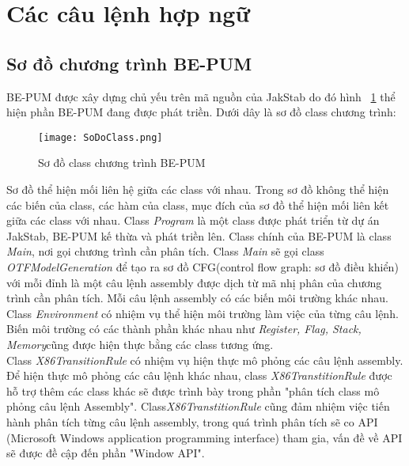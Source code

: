 \section{Các câu lệnh hợp ngữ}
	\subsection{Sơ đồ chương trình BE-PUM}
		BE-PUM được xây dựng chủ yếu trên mã nguồn của JakStab do đó hình ~\ref{fig:SoDoClass} thể hiện phần BE-PUM đang được phát triền. Dưới dây là sơ đồ class chương trình:
		\begin{center}
			\begin{figure}[htp]
				\begin{center}
					\texttt{[image: SoDoClass.png]}
				\end{center}
				\caption{Sơ đồ class chương trình BE-PUM}	
					\label{fig:SoDoClass}		
			\end{figure}
		\end{center}			
			
		Sơ đồ thể hiện mối liên hệ giữa các class với nhau. Trong sơ đồ không thể hiện các biến của class, các hàm của class, mục đích của sơ đồ thể hiện mối liên kết giữa các class với nhau. Class \textit{Program} là một class được phát triển từ dự án JakStab, BE-PUM kế thừa và phát triền lên. Class chính của BE-PUM là class \textit{Main}, nơi gọi chương trình cần phân tích. Class \textit{Main} sẽ gọi class \textit{OTFModelGeneration} để tạo ra sơ đồ CFG(control flow graph: sơ đồ điều khiển) với mỗi đỉnh là một câu lệnh assembly được dịch từ mã nhị phân của chương trình cần phân tích. Mỗi câu lệnh assembly có các biến môi trường khác nhau. Class \textit{Environment} có nhiệm vụ thể hiện môi trường làm việc của từng câu lệnh. Biến môi trường có các thành phần khác nhau như \textit{Register, Flag, Stack, Memory}cũng được hiện thực bằng các class tương ứng.\\
		
		Class  \textit{X86TransitionRule} có nhiệm vụ hiện thực mô phỏng các câu lệnh assembly. Để hiện thực mô phỏng các câu lệnh khác nhau, class \textit{X86TranstitionRule} được hỗ trợ thêm các class khác sẽ được trình bày trong phần "phân tích class mô phỏng câu lệnh Assembly". Class\textit{X86TranstitionRule} cũng đảm nhiệm việc tiến hành phân tích từng câu lệnh assembly, trong quá trình phân tích sẽ  co API (Microsoft Windows application programming interface) tham gia, vấn đề về API sẽ được đề cập đến phần "Window API".
		
